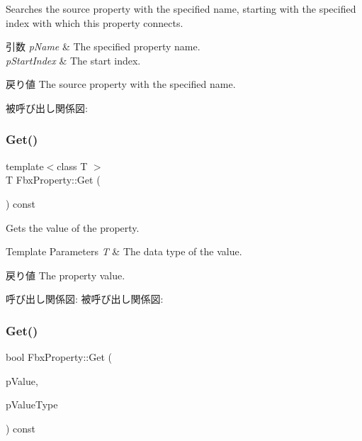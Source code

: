 Searches the source property with the specified name, starting with the specified index with which this property connects. 
\begin{DoxyParams}{引数}
{\em p\+Name} & The specified property name. \\
\hline
{\em p\+Start\+Index} & The start index. \\
\hline
\end{DoxyParams}
\begin{DoxyReturn}{戻り値}
The source property with the specified name. 
\end{DoxyReturn}
被呼び出し関係図\+:
\mbox{\label{class_fbx_property_a7d3760c0aec45b51823c57f62a08dc46}} 
\subsubsection{\texorpdfstring{Get()}{Get()}\hspace{0.1cm}{\footnotesize\ttfamily [1/2]}}
{\footnotesize\ttfamily template$<$class T $>$ \\
T Fbx\+Property\+::\+Get (\begin{DoxyParamCaption}{ }\end{DoxyParamCaption}) const}

Gets the value of the property. 
\begin{DoxyTemplParams}{Template Parameters}
{\em T} & The data type of the value. \\
\hline
\end{DoxyTemplParams}
\begin{DoxyReturn}{戻り値}
The property value. 
\end{DoxyReturn}
呼び出し関係図\+:
被呼び出し関係図\+:
\mbox{\label{class_fbx_property_ac2b8fdea0758676644547365cea1e2ae}} 
\subsubsection{\texorpdfstring{Get()}{Get()}\hspace{0.1cm}{\footnotesize\ttfamily [2/2]}}
{\footnotesize\ttfamily bool Fbx\+Property\+::\+Get (\begin{DoxyParamCaption}\item[{void $\ast$}]{p\+Value,  }\item[{const \hyperlink{fbxpropertytypes_8h_a73913a5ddfb20e57c6f25e9e6784bd92}{E\+Fbx\+Type} \&}]{p\+Value\+Type }\end{DoxyParamCaption}) const\hspace{0.3cm}{\ttfamily [protected]}}

